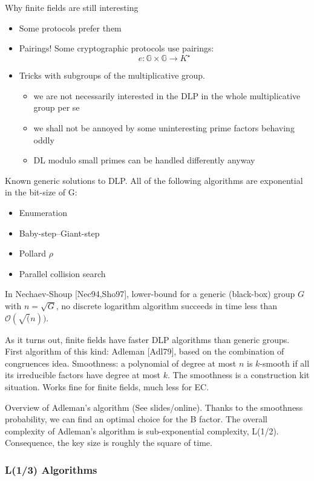 \documentclass[11pt]{article}
\begin{document}
Why finite fields are still interesting 
\begin{itemize}
	\item Some protocols prefer them
	\item Pairings! Some cryptographic protocols use pairings:
\[
	e: \mathbb{G} \times \mathbb{G} \to K^\star
\]
	\item Tricks with subgroups of the multiplicative group. \begin{itemize}
		\item we are not necessarily interested in the DLP in the whole
multiplicative group per se
		\item we shall not be annoyed by some uninteresting prime factors
behaving oddly
		\item DL modulo small primes can be handled differently anyway 
	\end{itemize}
\end{itemize}

Known generic solutions to DLP. All of the following algorithms are exponential in the bit-size of G:
\begin{itemize}
	\item Enumeration
	\item Baby-step–Giant-step
	\item Pollard $\rho$
	\item Parallel collision search
\end{itemize}

In Nechaev-Shoup [Nec94,Sho97], lower-bound for a generic (black-box) group $G$ with $n = \sqrt{G}$, no discrete logarithm algorithm succeeds in time less than $\mathcal{O}(\sqrt(n))$.

As it turns out, finite fields have faster DLP algorithms than generic groups. First algorithm of this kind: Adleman [Adl79], based on the combination of congruences idea. \newline
Smoothness: a polynomial of degree at most $n$ is $k$-smooth if all its irreducible factors have degree at most $k$. The smoothness is a construction kit situation. Works fine for finite fields, much less for EC. 

Overview of Adleman's algorithm (See slides/online). Thanks to the smoothness probability, we can find an optimal choice for the B factor. The overall complexity of Adleman's algorithm is sub-exponential complexity, L(1/2). Consequence, the key size is roughly the square of time.

\subsubsection{L(1/3) Algorithms}
\end{document}
